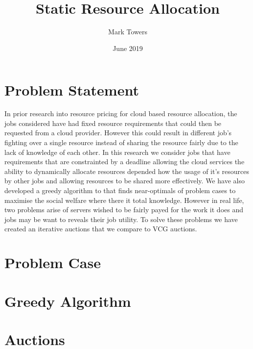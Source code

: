 \documentclass[fleqn]{article}
\title{Static Resource Allocation}
\author{Mark Towers}
\date{June 2019}
\begin{document}
\maketitle

\section{Problem Statement}\label{sec:problem-statement}
In prior research into resource pricing for cloud based resource allocation, the jobs considered have had
fixed resource requirements that could then be requested from a cloud provider. However this could result in
different job's fighting over a single resource instead of sharing the resource fairly due to the lack of knowledge of each other.
In this research we consider jobs that have requirements that are constrainted by a deadline allowing the
cloud services the ability to dynamically allocate resources depended how the usage of it's resources by other jobs
and allowing resources to be shared more effectively. We have also developed a greedy algorithm to that finds near-optimals
of problem cases to maximise the social welfare where there it total knowledge. However in real life, two problems arise of
servers wished to be fairly payed for the work it does and jobs may be want to reveals their job utility.
To solve these problems we have created an iterative auctions that we compare to VCG auctions.

\section{Problem Case}\label{sec:problem-case}


\section{Greedy Algorithm}\label{sec:greedy-algorithm}


\section{Auctions}\label{sec:auctions-idea}

\end{document}
